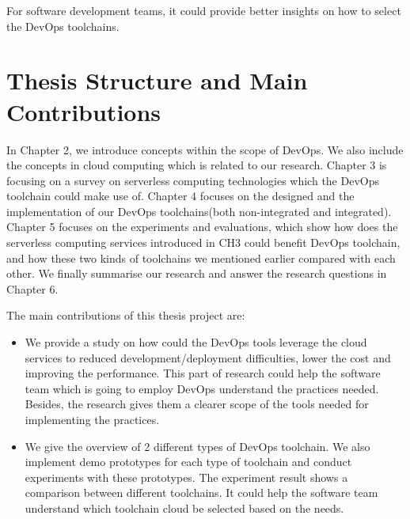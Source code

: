 For software development teams, it could provide better insights on how to select the DevOps toolchains.
\section{Thesis Structure and Main Contributions}
In Chapter 2, we introduce concepts within the scope of DevOps. We also include the concepts in cloud computing which is related to our research. Chapter 3 is focusing on a survey on serverless computing technologies which the DevOps toolchain could make use of. Chapter 4 focuses on the designed and the implementation of our DevOps toolchains(both non-integrated and integrated). Chapter 5 focuses on the experiments and evaluations, which show how does the serverless computing services introduced in CH3 could benefit DevOps toolchain, and how these two kinds of toolchains we mentioned earlier compared with each other. We finally summarise our research and answer the research questions in Chapter 6.
\par
The main contributions of this thesis project are:
\begin{itemize}
    \item We provide a study on how could the DevOps tools leverage the cloud services to reduced development/deployment difficulties, lower the cost and improving the performance. This part of research could help the software team which is going to employ DevOps understand the practices needed. Besides, the research gives them a clearer scope of the tools needed for implementing the practices.
    \item We give the overview of 2 different types of DevOps toolchain. We also implement demo prototypes for each type of toolchain and conduct experiments with these prototypes. The experiment result shows a comparison between different toolchains. It could help the software team understand which toolchain cloud be selected based on the needs.
\end{itemize}